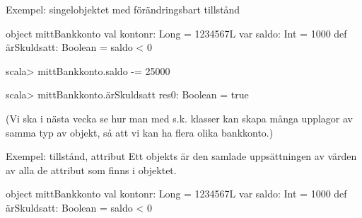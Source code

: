 \begin{Slide}{Exempel: singelobjektet med förändringsbart tillstånd} \SlideFontSmall
\begin{Code}[basicstyle=\ttfamily\fontsize{9}{11}\selectfont]
object mittBankkonto {
  val kontonr: Long        = 1234567L
  var saldo: Int           = 1000
  def ärSkuldsatt: Boolean = saldo < 0
}
\end{Code}
\begin{REPLnonum}
scala> mittBankkonto.saldo -= 25000

scala> mittBankkonto.ärSkuldsatt
res0: Boolean = true
\end{REPLnonum}

(Vi ska i nästa vecka se hur man med s.k. klasser kan skapa många upplagor av samma  typ av objekt, så att vi kan ha flera olika bankkonto.)
\end{Slide}



\begin{Slide}{Exempel: tillstånd, attribut}
Ett objekts  är den samlade uppsättningen av värden av alla de attribut som finns i objektet.
\begin{Code}[basicstyle=\ttfamily\fontsize{9}{11}\selectfont]
object mittBankkonto {
  val kontonr: Long        = 1234567L
  var saldo: Int           = 1000
  def ärSkuldsatt: Boolean = saldo < 0
}
\end{Code}
\end{Slide}


